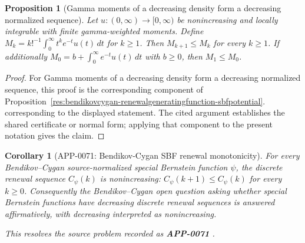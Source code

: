 \documentclass[11pt]{article}
\numberwithin{equation}{section}
\newtheorem{proposition}[theorem]{Proposition}
\newtheorem{corollary}[theorem]{Corollary}
\theoremstyle{definition}
\theoremstyle{remark}
\newcommand{\1}{\mathbf 1}
\begin{document}
\begin{proposition}[Gamma moments of a decreasing density form a decreasing normalized sequence]
\label{res:gammamonotonedensity-momentsequence-decreasing}
Let \(u:(0,\infty)\to[0,\infty)\) be nonincreasing and locally integrable with finite gamma-weighted moments. Define \(M_k=k!^{-1}\int_0^\infty t^k e^{-t}u(t)\,dt\) for \(k\ge1\). Then \(M_{k+1}\le M_k\) for every \(k\ge1\). If additionally \(M_0=b+\int_0^\infty e^{-t}u(t)\,dt\) with \(b\ge0\), then \(M_1\le M_0\).
\end{proposition}

\begin{proof}
For Gamma moments of a decreasing density form a decreasing normalized sequence, this proof is the corresponding component of Proposition~\ref{res:bendikovcygan-renewalgeneratingfunction-sbfpotential}.  corresponding to the displayed statement.  The cited argument establishes the shared certificate or normal form; applying that component to the present notation gives the claim.
\end{proof}

\begin{corollary}[APP-0071: Bendikov-Cygan SBF renewal monotonicity]
\label{res:bendikovcygan-sbf-renewalsequence-nonincreasing}
For every Bendikov--Cygan source-normalized special Bernstein function \(\psi\), the discrete renewal sequence \(C_\psi(k)\) is nonincreasing: \(C_\psi(k+1)\le C_\psi(k)\) for every \(k\ge0\). Consequently the Bendikov--Cygan open question asking whether special Bernstein functions have decreasing discrete renewal sequences is answered affirmatively, with decreasing interpreted as nonincreasing.



This resolves the source problem recorded as \textbf{APP-0071} \cite{app-app-0071-source}.
\end{corollary}
\end{document}

